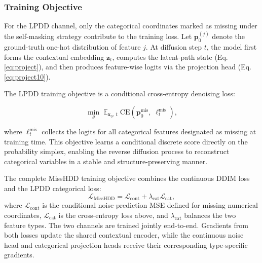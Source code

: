 \documentclass[times, review, 10pt]{elsarticle}
\begin{document}

\subsubsection{Training Objective}

For the LPDD channel, only the categorical coordinates marked as missing
under the self-masking strategy contribute to the training loss. Let
$\mathbf{p}_0^{(j)}$ denote the ground-truth one-hot distribution of feature
$j$. At diffusion step $t$, the model first forms the contextual embedding
$\mathbf{z}_t$, computes the latent-path state (Eq.\ref{eq:project}), and then
produces feature-wise logits via the projection head (Eq.\ref{eq:project10}).

The LPDD training objective is a conditional cross-entropy denoising loss:

\begin{equation}
\min_{\theta}\;
\mathbb{E}_{\mathbf{x}_0,\, t}\;
\mathrm{CE}\!\left(
\mathbf{p}_0^{\mathrm{mis}},\;
\boldsymbol{\ell}_t^{\mathrm{mis}}
\right),
\end{equation}

where $\boldsymbol{\ell}_t^{\mathrm{mis}}$ collects the logits for all
categorical features designated as missing at training time. This objective
learns a conditional discrete score directly on the probability simplex,
enabling the reverse diffusion process to reconstruct categorical variables in
a stable and structure-preserving manner.

The complete MissHDD training objective combines the continuous DDIM loss and
the LPDD categorical loss:
\begin{equation}
\mathcal{L}_{\mathrm{MissHDD}}
=
\mathcal{L}_{\mathrm{cont}}
+
\lambda_{\mathrm{cat}}\mathcal{L}_{\mathrm{cat}},
\label{eq:joint_loss}
\end{equation}
where $\mathcal{L}_{\mathrm{cont}}$ is the conditional noise-prediction MSE
defined for missing numerical coordinates, $\mathcal{L}_{\mathrm{cat}}$ is the
cross-entropy loss above, and $\lambda_{\mathrm{cat}}$ balances the two
feature types. The two channels are trained jointly end-to-end. Gradients from
both losses update the shared contextual encoder, while the continuous noise
head and categorical projection heads receive their corresponding
type-specific gradients.


\end{document}
